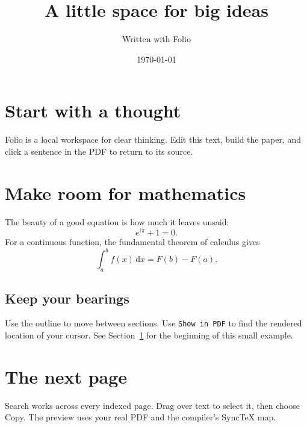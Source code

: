 \documentclass[11pt]{article}
\title{A little space for big ideas}
\author{Written with Folio}
\date{\today}
\begin{document}
\maketitle

\section{Start with a thought}
\label{sec:start}
Folio is a local workspace for clear thinking. Edit this text, build the
paper, and click a sentence in the PDF to return to its source.

\section{Make room for mathematics}
The beauty of a good equation is how much it leaves unsaid:
\begin{equation}
  e^{i\pi} + 1 = 0.
\end{equation}
For a continuous function, the fundamental theorem of calculus gives
\[
  \int_a^b f(x)\,\mathrm{d}x = F(b) - F(a).
\]

\subsection{Keep your bearings}
Use the outline to move between sections. Use \texttt{Show in PDF} to find
the rendered location of your cursor. See Section~\ref{sec:start} for the
beginning of this small example.

\newpage
\section{The next page}
Search works across every indexed page. Drag over text to select it, then
choose Copy. The preview uses your real PDF and the compiler's SyncTeX map.
\end{document}
